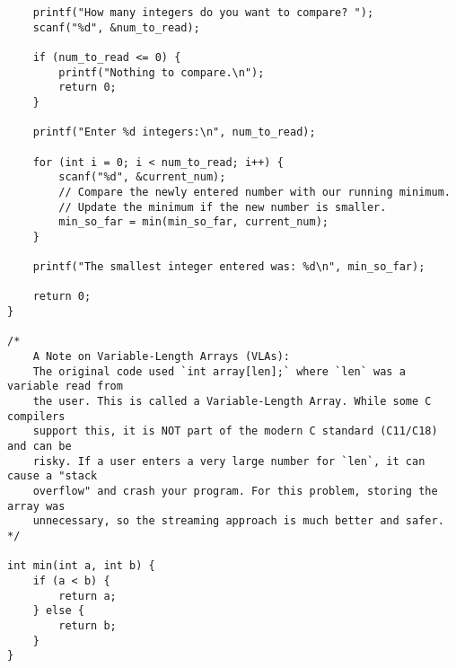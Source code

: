 \documentclass[11pt]{book}
\begin{document}
\begin{verbatim}
    printf("How many integers do you want to compare? ");
    scanf("%d", &num_to_read);

    if (num_to_read <= 0) {
        printf("Nothing to compare.\n");
        return 0;
    }

    printf("Enter %d integers:\n", num_to_read);

    for (int i = 0; i < num_to_read; i++) {
        scanf("%d", &current_num);
        // Compare the newly entered number with our running minimum.
        // Update the minimum if the new number is smaller.
        min_so_far = min(min_so_far, current_num);
    }

    printf("The smallest integer entered was: %d\n", min_so_far);

    return 0;
}

/*
    A Note on Variable-Length Arrays (VLAs):
    The original code used `int array[len];` where `len` was a variable read from
    the user. This is called a Variable-Length Array. While some C compilers
    support this, it is NOT part of the modern C standard (C11/C18) and can be
    risky. If a user enters a very large number for `len`, it can cause a "stack
    overflow" and crash your program. For this problem, storing the array was
    unnecessary, so the streaming approach is much better and safer.
*/

int min(int a, int b) {
    if (a < b) {
        return a;
    } else {
        return b;
    }
}

\end{verbatim}
\clearpage
\end{document}
